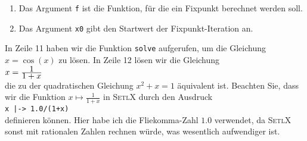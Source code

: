 \begin{enumerate}
\item Das Argument \texttt{f} ist die Funktion, f\"{u}r die ein Fixpunkt berechnet werden soll.
\item Das Argument \texttt{x0} gibt den Startwert der Fixpunkt-Iteration an.
\end{enumerate}
In Zeile 11 haben wir die Funktion \texttt{solve} aufgerufen, um die Gleichung $x = \cos(x)$ zu
l\"{o}sen.  In Zeile 12 l\"{o}sen wir die Gleichung 
\\[0.2cm]
\hspace*{1.3cm}
$x = \frac{\displaystyle1}{\displaystyle 1+x}$ 
\\[0.2cm]
die zu der quadratischen Gleichung $x^2 + x = 1$ \"{a}quivalent ist.  Beachten Sie, dass wir die
Funktion $x \mapsto \frac{1}{1+x}$ in \textsc{SetlX} durch den Ausdruck
\\[0.2cm]
\hspace*{1.3cm}
\texttt{x |-> 1.0/(1+x)}
\\[0.2cm]
definieren k\"{o}nnen.  Hier habe ich die Flie\3komma-Zahl $1.0$ verwendet, da \textsc{SetlX} sonst mit
rationalen Zahlen rechnen w\"{u}rde, was wesentlich aufwendiger ist.



